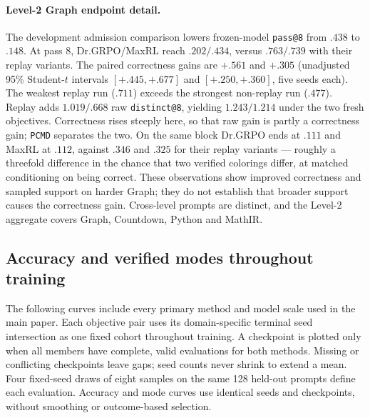 \documentclass{article}
\newcommand{\1}{\mathbf 1}
\newcommand{\pmd}{\texttt{PCMD}}
\theoremstyle{remark}
\theoremstyle{definition}
\theoremstyle{plain}
\begin{document}
\paragraph{Level-2 Graph endpoint detail.}
\label{app:levels-numerical-detail}
The development admission comparison lowers frozen-model \texttt{pass@8} from $.438$
to $.148$. At pass 8, Dr.GRPO/MaxRL reach $.202/.434$, versus $.763/.739$
with their replay variants. The paired correctness gains are $+.561$ and
$+.305$ (unadjusted 95\% Student-$t$ intervals $[+.445,+.677]$ and
$[+.250,+.360]$, five seeds each). The weakest replay run ($.711$) exceeds
the strongest non-replay run ($.477$). Replay adds $1.019/.668$ raw
\texttt{distinct@8}, yielding $1.243/1.214$ under the two fresh objectives.
Correctness rises steeply here, so that raw gain is partly a correctness gain;
\pmd{} separates the two. On the same block Dr.GRPO ends at $.111$ and MaxRL at
$.112$, against $.346$ and $.325$ for their replay variants --- roughly a
threefold difference in the chance that two verified colorings differ, at
matched conditioning on being correct.
These observations show improved correctness and sampled support on harder
Graph; they do not establish that broader support causes the correctness
gain. Cross-level prompts are distinct, and the Level-2 aggregate
covers Graph, Countdown, Python and MathIR.

\subsection{Accuracy and verified modes throughout training}
\label{app:factorial-training-curves}

The following curves include every primary method and model scale used
in the main paper. Each objective pair uses its domain-specific terminal
seed intersection as one fixed cohort throughout training. A checkpoint
is plotted only when all members have complete, valid evaluations for both
methods. Missing or conflicting checkpoints leave gaps; seed counts never
shrink to extend a mean. Four fixed-seed draws of eight samples on the same
128 held-out prompts define each evaluation. Accuracy and mode curves use
identical seeds and checkpoints, without smoothing or outcome-based selection.
\end{document}
